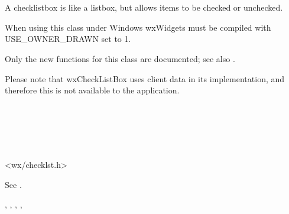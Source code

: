 
\section{}\label{wxchecklistbox}

A checklistbox is like a listbox, but allows items to be checked or unchecked.

When using this class under Windows wxWidgets must be compiled with USE\_OWNER\_DRAWN set to 1.

Only the new functions for this class are documented; see also .

Please note that wxCheckListBox uses client data in its implementation,
and therefore this is not available to the application.


\\
\\
\\
\\


<wx/checklst.h>


See .


\twocolwidtha{7cm}
\begin{twocollist}\itemsep=0pt
\end{twocollist}


, , , ,
\rtfsp{}

